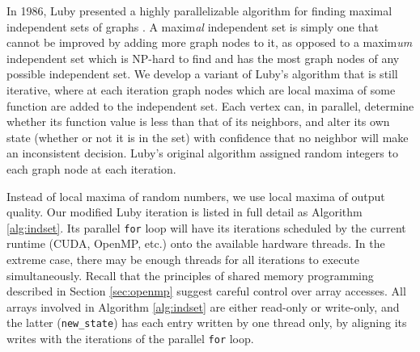 In 1986, Luby presented a highly parallelizable algorithm
for finding maximal independent sets of graphs \cite{luby1986simple}.
A maxim\emph{al} independent set is simply one that cannot be improved by
adding more graph nodes to it, as opposed to a maxim\emph{um} independent
set which is NP-hard to find and has the most graph nodes of any
possible independent set.
We develop a variant of Luby's algorithm that is still iterative,
where at each iteration graph nodes which are local maxima of some function
are added to the independent set.
Each vertex can, in parallel, determine whether its function value is
less than that of its neighbors, and alter its own state
(whether or not it is in the set)
with confidence that no neighbor will make an inconsistent decision.
Luby's original algorithm assigned random integers to each graph node
at each iteration.

Instead of local maxima of random numbers, we use local maxima of
output quality.
Our modified Luby iteration is listed in full detail
as Algorithm \ref{alg:indset}.
Its parallel \texttt{for} loop will have its iterations scheduled by the
current runtime (CUDA, OpenMP, etc.) onto the available hardware threads.
In the extreme case, there may be enough threads for all iterations
to execute simultaneously.
Recall that the principles of shared memory programming described
in Section \ref{sec:openmp} suggest careful control over array accesses.
All arrays involved in Algorithm \ref{alg:indset} are either read-only
or write-only, and the latter (\texttt{new\_state}) has each entry written
by one thread only, by aligning its writes with the iterations
of the parallel \texttt{for} loop.

